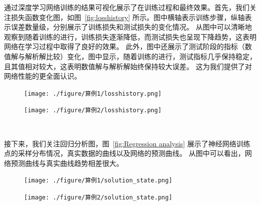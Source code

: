 \documentclass{Sichuan Normal University}
\begin{document}
通过深度学习网络训练的结果可视化展示了在训练过程和最终效果。首先，我们关注损失函数变化图，如图~\ref{fig:losshistory} 所示。图中横轴表示训练步骤，纵轴表示误差数量级，分别展示了训练损失和测试损失的变化情况。
从图中可以清晰地观察到随着训练的进行，训练损失逐渐降低，而测试损失也呈现下降趋势，这表明网络在学习过程中取得了良好的效果。
此外，图中还展示了测试阶段的指标（数值解与解析解比较）变化，图中显示，随着训练的进行，测试指标几乎保持稳定，且其值相对较大，这表明数值解与解析解始终保持较大误差。
这为我们提供了对网络性能的更全面认识。

\begin{figure}[H]
    \centering
    \begin{minipage}[c]{0.48\textwidth}
    \centering
    \texttt{[image: ./figure/算例1/losshistory.png]}
    \end{minipage}
    \hspace{0.02\textwidth}
    \begin{minipage}[c]{0.48\textwidth}
    \centering
    \texttt{[image: ./figure/算例2/losshistory.png]}
    \end{minipage}\\[3mm]
    \begin{minipage}[t]{0.48\textwidth}
    \centering
    \label{fig:losshistory}
    \end{minipage}
    \hspace{0.02\textwidth}
    \begin{minipage}[t]{0.48\textwidth}
    \centering
    \label{fig:losshistory2}
    \end{minipage}
    \end{figure}

接下来，我们关注回归分析图，图~\ref{fig:Regression analysis} 展示了神经网络训练点的采样分布情况，真实数据的曲线以及网络的预测曲线。
从图中可以看出，网络预测曲线与真实曲线趋势相差很大。

\begin{figure}[H]
    \centering
    \begin{minipage}[c]{0.48\textwidth}
    \centering
    \texttt{[image: ./figure/算例1/solution\_state.png]}
    \end{minipage}
    \hspace{0.02\textwidth}
    \begin{minipage}[c]{0.48\textwidth}
    \centering
    \texttt{[image: ./figure/算例2/solution\_state.png]}
    \end{minipage}\\[3mm]
    \begin{minipage}[t]{0.48\textwidth}
    \centering
    \label{fig:Regression analysis}
    \end{minipage}
    \hspace{0.02\textwidth}
    \begin{minipage}[t]{0.48\textwidth}
    \centering
    \label{fig:Regression analysis2}
    \end{minipage}
    \end{figure}
\end{document}
